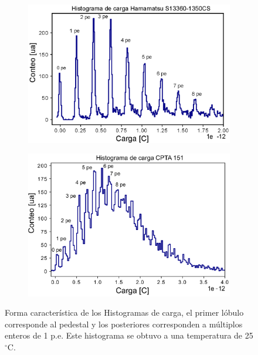 \begin{figure}[h!]
     \centering
     \begin{subfigure}[b]{0.49\textwidth}
         \centering
         \includegraphics[width=1.1\textwidth]{Images/Charge_13360.eps}
         \caption{}
         \label{fig:charge_1360}
     \end{subfigure}
     \begin{subfigure}[b]{0.49\textwidth}
         \centering
         \includegraphics[width=1.1\textwidth]{Images/Charge_cpta.eps}
         \caption{}
         \label{fig:charge_cpta}
     \end{subfigure}
        \caption{Forma característica de los Histogramas de carga, el primer lóbulo corresponde al pedestal y los posteriores corresponden a múltiplos enteros de 1 p.e. Este histograma se obtuvo a una temperatura de 25 $^\circ$C.}
        \label{fig:charge}
\end{figure}
